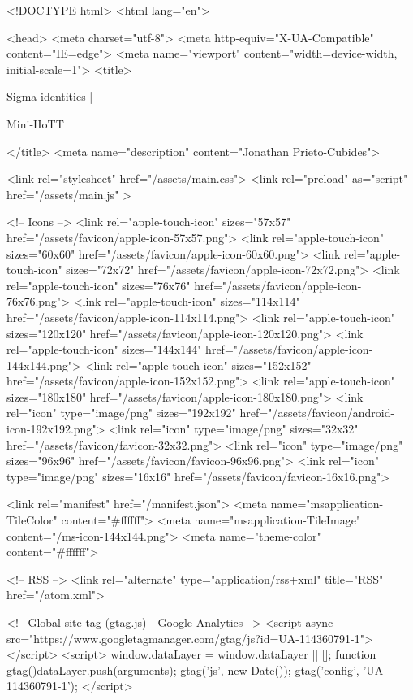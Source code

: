 <!DOCTYPE html>
<html lang="en">

<head>
  <meta charset="utf-8">
  <meta http-equiv="X-UA-Compatible" content="IE=edge">
  <meta name="viewport" content="width=device-width, initial-scale=1">
  <title>
    
      
        Sigma identities |
      
        Mini-HoTT
    
  </title>
  <meta name="description" content="Jonathan Prieto-Cubides">

  <link rel="stylesheet" href="/assets/main.css">
  <link rel="preload" as="script" href="/assets/main.js" >

  <!-- Icons -->
  <link rel="apple-touch-icon" sizes="57x57" href="/assets/favicon/apple-icon-57x57.png">
  <link rel="apple-touch-icon" sizes="60x60" href="/assets/favicon/apple-icon-60x60.png">
  <link rel="apple-touch-icon" sizes="72x72" href="/assets/favicon/apple-icon-72x72.png">
  <link rel="apple-touch-icon" sizes="76x76" href="/assets/favicon/apple-icon-76x76.png">
  <link rel="apple-touch-icon" sizes="114x114" href="/assets/favicon/apple-icon-114x114.png">
  <link rel="apple-touch-icon" sizes="120x120" href="/assets/favicon/apple-icon-120x120.png">
  <link rel="apple-touch-icon" sizes="144x144" href="/assets/favicon/apple-icon-144x144.png">
  <link rel="apple-touch-icon" sizes="152x152" href="/assets/favicon/apple-icon-152x152.png">
  <link rel="apple-touch-icon" sizes="180x180" href="/assets/favicon/apple-icon-180x180.png">
  <link rel="icon" type="image/png" sizes="192x192"  href="/assets/favicon/android-icon-192x192.png">
  <link rel="icon" type="image/png" sizes="32x32" href="/assets/favicon/favicon-32x32.png">
  <link rel="icon" type="image/png" sizes="96x96" href="/assets/favicon/favicon-96x96.png">
  <link rel="icon" type="image/png" sizes="16x16" href="/assets/favicon/favicon-16x16.png">

  <link rel="manifest" href="/manifest.json">
  <meta name="msapplication-TileColor" content="#ffffff">
  <meta name="msapplication-TileImage" content="/ms-icon-144x144.png">
  <meta name="theme-color" content="#ffffff">

  <!-- RSS -->
  <link rel="alternate" type="application/rss+xml" title="RSS" href="/atom.xml">

  <!-- Global site tag (gtag.js) - Google Analytics -->
  <script async src="https://www.googletagmanager.com/gtag/js?id=UA-114360791-1"></script>
  <script>
    window.dataLayer = window.dataLayer || [];
    function gtag(){dataLayer.push(arguments);}
    gtag('js', new Date());
    gtag('config', 'UA-114360791-1');
  </script>

